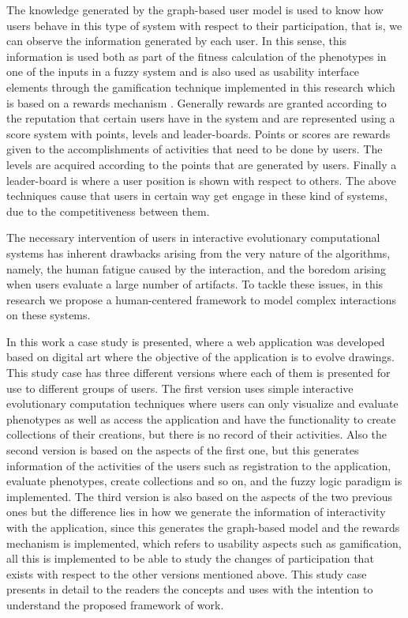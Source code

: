 \par The knowledge generated by the graph-based user model is used to know how users
behave in this type of system with respect to their participation, that is, we
can observe the information generated by each user. In this sense, this
information is used both as part of the fitness calculation of the phenotypes in
one of the inputs in a fuzzy system and is also used as usability interface elements
through the gamification technique\cite{huotari2012defining}\cite{deterding2011game}\cite{hickman2010total}\cite{mcgonigal2011reality}
implemented in this research which is based on a rewards mechanism \cite{sutter2010browse}.
Generally rewards are granted according to the reputation that certain users
have in the system and are represented using a score system with points, levels and
leader-boards. Points or scores are rewards given to the accomplishments of
activities that need to be done by users. The levels are acquired according to
the points that are generated by users. Finally a leader-board is where a user position
is shown with respect to others. The above
techniques cause that users in certain way get engage in these kind of
systems, due to the competitiveness between them.


\par The necessary intervention of users in interactive evolutionary computational
systems has inherent drawbacks arising from the very nature of the algorithms,
namely, the human fatigue caused by the interaction, and the boredom arising
when users evaluate a large number of artifacts. To tackle these issues, in this
research we propose a human-centered framework to model complex interactions on
these systems.

\par In this work a case study is presented, where a web application was
developed based on digital art where the objective of the application is to
evolve drawings. This study case has three different versions where each of them
is presented for use to different groups of users. The first version uses simple
interactive evolutionary computation techniques where users can only visualize
and evaluate phenotypes as well as access the application and have the
functionality to create collections of their creations, but there is no record
of their activities. Also the second version is based on the aspects of the
first one, but this generates information of the activities of the users such as
registration to the application, evaluate phenotypes, create collections and so
on, and the fuzzy logic paradigm is implemented. The third version is also
based on the aspects of the two previous ones but the difference lies in how we
generate the information of interactivity with the application, since this
generates the graph-based model and the rewards mechanism is implemented, which
refers to usability aspects such as gamification, all this is implemented to be
able to study the changes of participation that exists with respect to the other
versions mentioned above. This study case presents in detail to the readers the
concepts and uses with the intention to understand the proposed framework of work.


